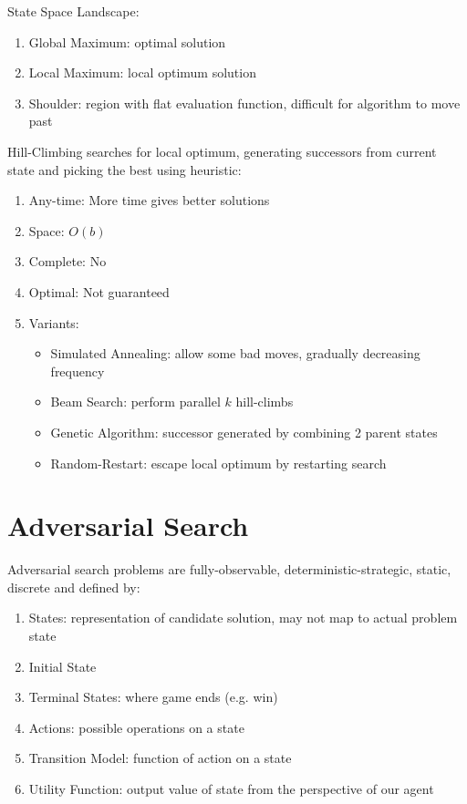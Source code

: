 \documentclass[12pt, a4paper]{article}
\begin{document}
\begin{multicols*}{3}
State Space Landscape:
\begin{enumerate}[\roman*.]
  \item Global Maximum: optimal solution 
  \item Local Maximum: local optimum solution 
  \item Shoulder: region with flat evaluation function, difficult for algorithm to move past
\end{enumerate}

Hill-Climbing searches for local optimum, generating successors from current state and picking the best using heuristic:
\begin{enumerate}[\roman*.]
  \item Any-time: More time gives better solutions
  \item Space: $O(b)$
  \item Complete: No 
  \item Optimal: Not guaranteed
  \item Variants:
    \begin{itemize}[leftmargin=*]\vspace{3pt}
      \item Simulated Annealing: allow some bad moves, gradually decreasing frequency 
      \item Beam Search: perform parallel $k$ hill-climbs 
      \item Genetic Algorithm: successor generated by combining 2 parent states 
      \item Random-Restart: escape local optimum by restarting search
    \end{itemize}
\end{enumerate}


\colbreak
\section{Adversarial Search}
Adversarial search problems are fully-observable, deterministic-strategic, static, discrete and defined by:
\begin{enumerate}[\roman*.]
  \item States: representation of candidate solution, may not map to actual problem state
  \item Initial State 
  \item Terminal States: where game ends (e.g. win)
  \item Actions: possible operations on a state
  \item Transition Model: function of action on a state
  \item Utility Function: output value of state from the perspective of our agent
\end{enumerate}


\end{multicols*}
\end{document}
